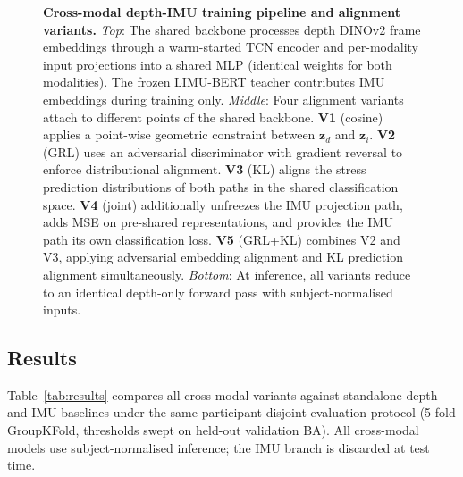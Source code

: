 \documentclass[sigconf,anonymous=false]{acmart}
\begin{document}
\begin{figure}[t]
\begin{tikzpicture}
\end{tikzpicture}
\caption{
  \textbf{Cross-modal depth-IMU training pipeline and alignment variants.}
  \textit{Top}: The shared backbone processes depth DINOv2 frame embeddings
  through a warm-started TCN encoder and per-modality input projections into a
  shared MLP (identical weights for both modalities).
  The frozen LIMU-BERT teacher contributes IMU embeddings during training only.
  \textit{Middle}: Four alignment variants attach to different points of the
  shared backbone.
  \textbf{V1} (cosine) applies a point-wise geometric constraint between
  $\mathbf{z}_d$ and $\mathbf{z}_i$.
  \textbf{V2} (GRL) uses an adversarial discriminator with gradient
  reversal to enforce distributional alignment.
  \textbf{V3} (KL) aligns the stress prediction distributions of both
  paths in the shared classification space.
  \textbf{V4} (joint) additionally unfreezes the IMU projection path,
  adds MSE on pre-shared representations, and provides the IMU path its
  own classification loss.
  \textbf{V5} (GRL+KL) combines V2 and V3, applying adversarial
  embedding alignment and KL prediction alignment simultaneously.
  \textit{Bottom}: At inference, all variants reduce to an identical
  depth-only forward pass with subject-normalised inputs.
}
\label{fig:pipeline}
\end{figure}

\subsection{Results}
\label{sec:results}

Table~\ref{tab:results} compares all cross-modal variants against standalone
depth and IMU baselines under the same participant-disjoint evaluation
protocol (5-fold GroupKFold, thresholds swept on held-out validation BA).
All cross-modal models use subject-normalised inference; the IMU branch is
discarded at test time.
\end{document}

